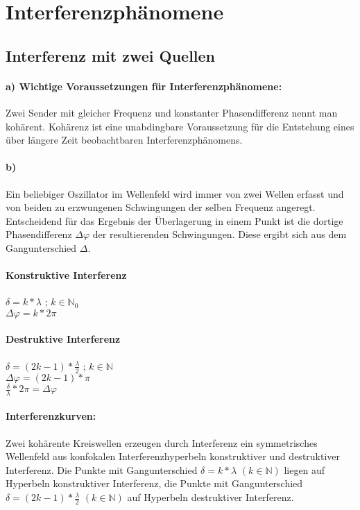 \section{Interferenzphänomene}
		\subsection{Interferenz mit zwei Quellen}
			\paragraph{a) Wichtige Voraussetzungen für Interferenzphänomene:} 
			Zwei Sender mit gleicher Frequenz und konstanter Phasendifferenz nennt man kohärent. Kohärenz ist eine unabdingbare Voraussetzung für die Entstehung eines über längere Zeit beobachtbaren Interferenzphänomens.
			
			\paragraph{b)} Ein beliebiger Oszillator im Wellenfeld wird immer von zwei Wellen erfasst und von beiden zu erzwungenen Schwingungen der selben Frequenz angeregt. Entscheidend für das Ergebnis der Überlagerung in einem Punkt ist die dortige Phasendifferenz $\Delta \varphi$ der resultierenden Schwingungen. Diese ergibt sich aus dem Gangunterschied $\Delta$.
			
			\paragraph{Konstruktive Interferenz} $ \delta = k \ast \lambda $ ; $k \in \mathbb{N}_0$ \\
			\hspace{40mm} $ \Delta \varphi = k \ast 2\pi$
			
			\paragraph{Destruktive Interferenz} $ \delta = (2k-1) \ast \frac{\lambda}{2} $ ; $k \in \mathbb{N} $ \\
			\hspace{40mm} $ \Delta \varphi = (2k-1) \ast \pi $ 
			\vspace{5mm} \\
			$ \frac{\delta}{\lambda} \ast 2\pi = \Delta \varphi$
			
			\paragraph{Interferenzkurven:} Zwei kohärente Kreiswellen erzeugen durch Interferenz ein symmetrisches Wellenfeld aus konfokalen Interferenzhyperbeln konstruktiver und destruktiver Interferenz. Die Punkte mit Gangunterschied $ \delta = k \ast \lambda $ $(k \in \mathbb{N}) $ liegen auf Hyperbeln konstruktiver Interferenz, die Punkte mit Gangunterschied $ \delta = (2k-1) \ast \frac{\lambda}{2}$ $(k \in \mathbb{N}) $ auf Hyperbeln destruktiver Interferenz. 
			
